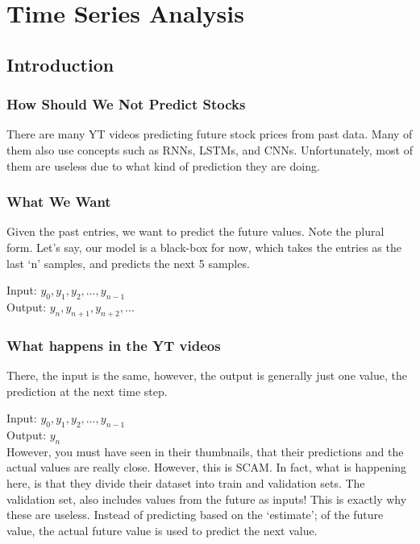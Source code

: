 \chapter{Time Series Analysis}

\section{Introduction}

\subsection{How Should We Not Predict Stocks}

There are many YT videos predicting future stock prices from past data. Many of them also use concepts such as RNNs, LSTMs, and CNNs. Unfortunately, most of them are useless due to what kind of prediction they are doing.

\subsection{What We Want}

Given the past entries, we want to predict the future values. Note the plural form. Let’s say, our model is a black-box for now, which takes the entries as the last ‘n’ samples, and predicts the next 5 samples.

\noindent Input: $y_0, y_1, y_2, \dots, y_{n-1}$ \\
\noindent Output: $y_n, y_{n+1}, y_{n+2}, \dots$

\subsection{What happens in the YT videos}

There, the input is the same, however, the output is generally just one value, the prediction at the next time step.

\noindent Input: $y_0, y_1, y_2, \dots, y_{n-1}$ \\
\noindent Output: $y_n$ \\

However, you must have seen in their thumbnails, that their predictions and the actual values are really close. However, this is SCAM. In fact, what is happening here, is that they divide their dataset into train and validation sets. The validation set, also includes values from the future as inputs! This is exactly why these are useless. Instead of predicting based on the ‘estimate’; of the future value, the actual future value is used to predict the next value. 

